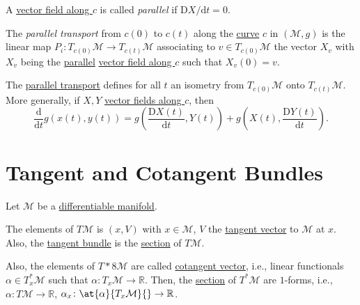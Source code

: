 \begin{definition}[Parallel]\label{def:parallel}
	A \hyperref[def:vector-field-along-a-curve]{vector field along \(c\)} is called \emph{parallel} if \(\mathrm{D} X/ \mathrm{d} t = 0\).
\end{definition}

\begin{definition}\label{def:parallel-transport}
	The \emph{parallel transport} from \(c(0)\) to \(c(t)\) along the \hyperref[def:curve]{curve} \(c\) in \((\mathcal{M} , g)\) is the linear map \(P_i \colon T_{c(0)} \mathcal{M} \to T_{c(t) }\mathcal{M} \) associating to \(v\in T_{c(0)} \mathcal{M} \) the vector \(X_v\) with \(X_v\) being the \hyperref[def:parallel]{parallel} \hyperref[def:vector-field-along-a-curve]{vector field along \(c\)} such that \(X_v (0) =v\).
\end{definition}

\begin{proposition}
	The \hyperref[def:parallel-transport]{parallel transport} defines for all \(t\) an isometry from \(T_{c(0)} \mathcal{M} \) onto \(T_{c(t)} \mathcal{M} \). More generally, if \(X, Y\) \hyperref[def:vector-field-along-a-curve]{vector fields along \(c\)}, then
	\[
		\frac{\mathrm{d}}{\mathrm{d}t} g(x(t), y(t))
		= g\left( \frac{\mathrm{D} X(t)}{\mathrm{d} t}, Y(t)\right) + g\left(X(t), \frac{\mathrm{D} Y(t)}{\mathrm{d} t} \right) .
	\]
\end{proposition}

\section{Tangent and Cotangent Bundles}
Let \(\mathcal{M} \) be a \hyperref[def:smooth-manifold]{differentiable manifold}.

\begin{prev}
	The elements of \(T \mathcal{M} \) is \((x, V)\) with \(x\in \mathcal{M} \), \(V\) the \hyperref[def:tangent-vector]{tangent vector} to \(\mathcal{M} \) at \(x\). Also, the \hyperref[def:tangent-bundle]{tangent bundle} is the \hyperref[def:section]{section} of \(T \mathcal{M} \).

	Also, the elements of \(T*8\mathcal{M} \) are called \hyperref[def:cotangent-vector]{cotangent vector}, i.e., linear functionals \(\alpha \in T_x ^{\ast} \mathcal{M} \) such that \(\alpha \colon T_x \mathcal{M} \to \mathbb{R} \). Then, the \hyperref[def:section]{section} of \(T^{\ast} \mathcal{M} \) are \(1\)-forms, i.e., \(\alpha \colon T \mathcal{M} \to \mathbb{R} \), \(\alpha _x \colon \at{\alpha }{T_x \mathcal{M} }{} \to \mathbb{R} \).
\end{prev}

